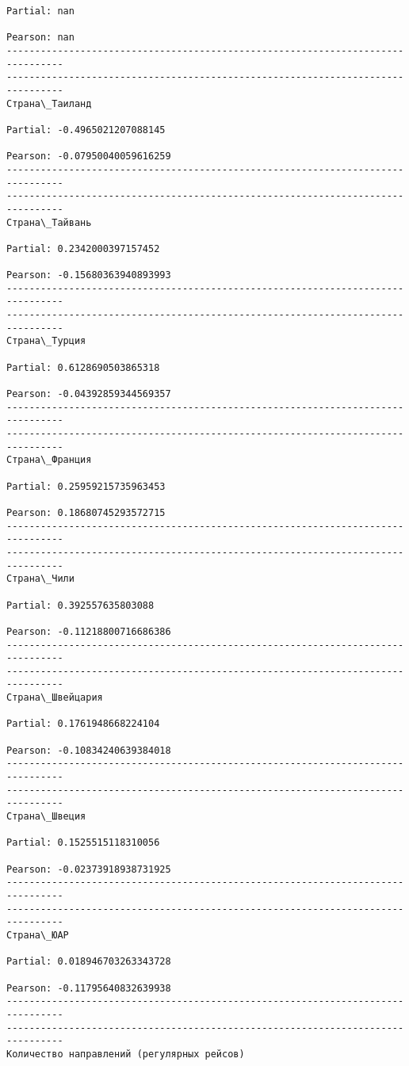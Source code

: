 \documentclass[11pt,mathletters]{article}
\begin{document}
\begin{Verbatim}[commandchars=\\\{\}]
Partial: nan

Pearson: nan
--------------------------------------------------------------------------------
--------------------------------------------------------------------------------
Страна\_Таиланд

Partial: -0.4965021207088145

Pearson: -0.07950040059616259
--------------------------------------------------------------------------------
--------------------------------------------------------------------------------
Страна\_Тайвань

Partial: 0.2342000397157452

Pearson: -0.15680363940893993
--------------------------------------------------------------------------------
--------------------------------------------------------------------------------
Страна\_Турция

Partial: 0.6128690503865318

Pearson: -0.04392859344569357
--------------------------------------------------------------------------------
--------------------------------------------------------------------------------
Страна\_Франция

Partial: 0.25959215735963453

Pearson: 0.18680745293572715
--------------------------------------------------------------------------------
--------------------------------------------------------------------------------
Страна\_Чили

Partial: 0.392557635803088

Pearson: -0.11218800716686386
--------------------------------------------------------------------------------
--------------------------------------------------------------------------------
Страна\_Швейцария

Partial: 0.1761948668224104

Pearson: -0.10834240639384018
--------------------------------------------------------------------------------
--------------------------------------------------------------------------------
Страна\_Швеция

Partial: 0.1525515118310056

Pearson: -0.02373918938731925
--------------------------------------------------------------------------------
--------------------------------------------------------------------------------
Страна\_ЮАР

Partial: 0.018946703263343728

Pearson: -0.11795640832639938
--------------------------------------------------------------------------------
--------------------------------------------------------------------------------
Количество направлений (регулярных рейсов)


\end{Verbatim}
\end{document}

